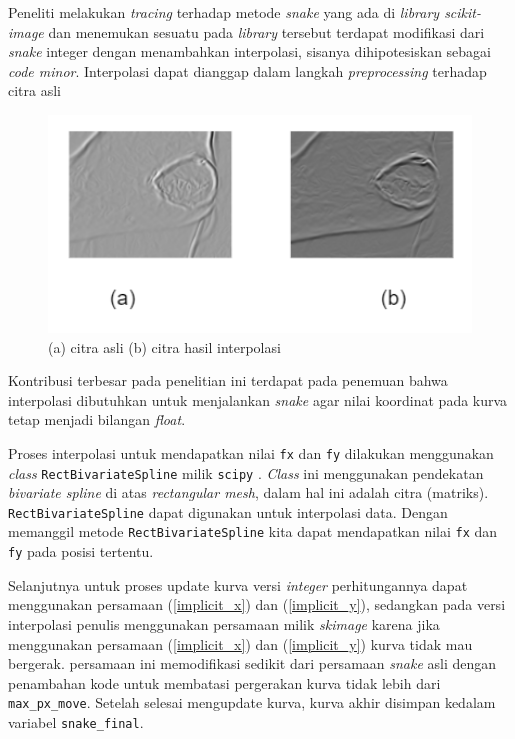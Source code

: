 Peneliti melakukan \emph{tracing} terhadap metode \emph{snake} yang ada di \emph{library scikit-image} dan menemukan sesuatu pada \emph{library} tersebut terdapat modifikasi dari \emph{snake} integer dengan menambahkan interpolasi, sisanya dihipotesiskan sebagai \emph{code minor}. Interpolasi dapat dianggap dalam langkah \emph{preprocessing} terhadap citra asli
\begin{figure}[H]
	\centering
	\includegraphics[width=1\textwidth]{gambar/compare_ori_interp}
	\caption{(a) citra asli (b) citra hasil interpolasi}
	\label{Gambar:compare_ori_interp}
\end{figure}
Kontribusi terbesar pada penelitian ini terdapat pada penemuan bahwa interpolasi dibutuhkan untuk menjalankan \emph{snake} agar nilai koordinat pada kurva tetap menjadi bilangan \emph{float}.

Proses interpolasi untuk mendapatkan nilai \texttt{fx} dan \texttt{fy} dilakukan menggunakan \emph{class} \texttt{RectBivariateSpline} milik \texttt{scipy} \citep{rbs}. \emph{Class} ini menggunakan pendekatan \emph{bivariate spline} di atas \emph{rectangular mesh}, dalam hal ini adalah citra (matriks). \texttt{RectBivariateSpline} dapat digunakan untuk interpolasi data. Dengan memanggil metode \texttt{RectBivariateSpline} kita dapat mendapatkan nilai \texttt{fx} dan \texttt{fy} pada posisi tertentu.

Selanjutnya untuk proses update kurva versi \emph{integer} perhitungannya dapat menggunakan persamaan (\ref{implicit_x}) dan (\ref{implicit_y}), sedangkan pada versi interpolasi penulis menggunakan persamaan milik \emph{skimage} \citep{acm} karena jika menggunakan persamaan (\ref{implicit_x}) dan (\ref{implicit_y}) kurva tidak mau bergerak. persamaan ini memodifikasi sedikit dari persamaan \emph{snake} asli dengan penambahan kode untuk membatasi pergerakan kurva tidak lebih dari \texttt{max\_px\_move}. Setelah selesai mengupdate kurva, kurva akhir disimpan kedalam variabel \texttt{snake\_final}.

